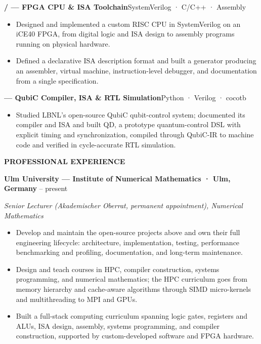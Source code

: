 \documentclass[10pt]{article}
\makeatletter
\newcommand{\link}[2]{\href{#1}{\textcolor{link}{\linkUnderLine{#2}}}}
\newcommand{\headsize}{\fontsize{10.5bp}{11.45bp}\selectfont}
\newcommand{\smallsize}{\fontsize{9.5bp}{11.45bp}\selectfont}
\newcommand{\cv@entryskip}{4.6bp}
\newcommand{\cvsection}[1]{%
  \par\addvspace{6.85bp}%
  {\headsize\bfseries\color{heading}%
    \leavevmode\rlap{\color{rule}\rule[-3.15bp]{\linewidth}{0.5bp}}#1\par}%
  \nopagebreak\addvspace{2.2bp}%
  \gdef\cv@entryskip{4.8bp}%
}
\newcommand{\cventry}[2]{%
  \par\addvspace{\cv@entryskip}%
  {\bfseries #1}\hfill{\smallsize #2}\kern0.85bp\par %
  \nopagebreak
  \gdef\cv@entryskip{4.1bp}%
}
\newcommand{\cvsubtitle}[1]{%
  \vspace{0.7bp}%
  {\smallsize\itshape #1\par}%
  \nopagebreak\addvspace{0.9bp}%
}
\newenvironment{cvitems}
  {\begin{itemize}[label=•, leftmargin=15bp, labelwidth=10bp, labelsep=0bp,
                   align=left, topsep=0.55bp, partopsep=0bp, parsep=0bp,
                   itemsep=1.5bp, beginpenalty=10000]}
  {\end{itemize}\gdef\cv@entryskip{4.6bp}}
\makeatother
\begin{document}
\cventry{{\mdseries\link{https://github.com/michael-lehn/ulm-on-ice}{ulm-on-iCE}} / {\mdseries\link{https://github.com/michael-lehn/ulm-generator}{ulm-generator}} — FPGA CPU \& ISA Toolchain}{SystemVerilog · C/C++ · Assembly}
\begin{cvitems}
  \item Designed and implemented a custom RISC CPU in SystemVerilog on an iCE40 FPGA, from digital logic and ISA design to assembly programs running on physical hardware.
  \item Defined a declarative ISA description format and built a generator producing an assembler, virtual machine, instruction-level debugger, and documentation from a single specification.
\end{cvitems}

\cventry{{\mdseries\link{https://github.com/michael-lehn/qubic-notes}{qubic-notes}} — QubiC Compiler, ISA \& RTL Simulation}{Python · Verilog · cocotb}
\begin{cvitems}
  \item Studied LBNL's open-source QubiC qubit-control system; documented its compiler and ISA and built QD, a prototype quantum-control DSL with explicit timing and synchronization, compiled through QubiC-IR to machine code and verified in cycle-accurate RTL simulation.
\end{cvitems}

\cvsection{PROFESSIONAL EXPERIENCE}

\cventry{Ulm University — Institute of Numerical Mathematics · Ulm, Germany}{2008 – present}
\cvsubtitle{Senior Lecturer (Akademischer Oberrat, permanent appointment), Numerical Mathematics}
\begin{cvitems}
  \item Develop and maintain the open-source projects above and own their full engineering lifecycle: architecture, implementation, testing, performance benchmarking and profiling, documentation, and long-term maintenance.
  \item Design and teach courses in HPC, compiler construction, systems programming, and numerical mathematics; the HPC curriculum goes from memory hierarchy and cache-aware algorithms through SIMD micro-kernels and multithreading to MPI and GPUs.
  \item Built a full-stack computing curriculum spanning logic gates, registers and ALUs, ISA design, assembly, systems programming, and compiler construction, supported by custom-developed software and FPGA hardware.
\end{cvitems}
\end{document}

